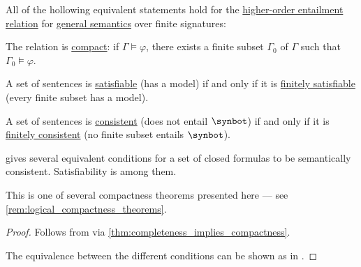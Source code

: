 \begin{theorem}\label{thm:hol_weak_semantic_compactness}
  All of the hollowing equivalent statements hold for the \hyperref[def:hol_semantics/entailment]{higher-order entailment relation} for \hyperref[def:hol_semantics/standard]{general semantics} over finite signatures:
  \begin{thmenum}
     The relation is \hyperref[def:consequence_relation/compactness]{compact}: if \( \Gamma \vDash \varphi \), there exists a finite subset \( \Gamma_0 \) of \( \Gamma \) such that \( \Gamma_0 \vDash \varphi \).

     A set of sentences is \hyperref[def:hol_semantics/model]{satisfiable} (has a model) if and only if it is \hyperref[def:finitely_satisfiable_set_of_sentences]{finitely satisfiable} (every finite subset has a model).

     A set of sentences is \hyperref[def:hol_theory/consistent]{consistent} (does not entail \( \synbot \)) if and only if it is \hyperref[def:finitely_consistent_set_of_sentences]{finitely consistent} (no finite subset entails \( \synbot \)).
  \end{thmenum}
\end{theorem}
\begin{comments}
  \item {} gives several equivalent conditions for a set of closed formulas to be semantically consistent. Satisfiability is among them.

  \item This is one of several compactness theorems presented here --- see \cref{rem:logical_compactness_theorems}.
\end{comments}
\begin{proof}
   Follows from  via \cref{thm:completeness_implies_compactness}.

  The equivalence between the different conditions can be shown as in .
\end{proof}

